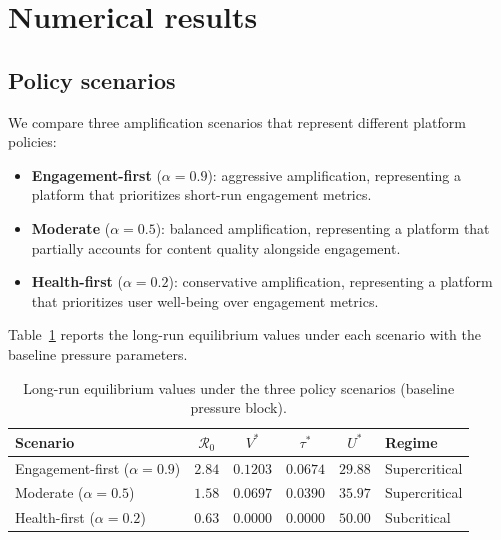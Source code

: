\documentclass[11pt]{article}
\begin{document}
\section{Numerical results}
\label{sec:results}

\subsection{Policy scenarios}

We compare three amplification scenarios that represent different platform policies:
\begin{itemize}[leftmargin=1.5em]
    \item \textbf{Engagement-first} ($\alpha = 0.9$): aggressive amplification, representing a platform that prioritizes short-run engagement metrics.
    \item \textbf{Moderate} ($\alpha = 0.5$): balanced amplification, representing a platform that partially accounts for content quality alongside engagement.
    \item \textbf{Health-first} ($\alpha = 0.2$): conservative amplification, representing a platform that prioritizes user well-being over engagement metrics.
\end{itemize}

Table~\ref{tab:scenarios} reports the long-run equilibrium values under each scenario with the baseline pressure parameters.

\begin{table}[H]
\centering
\caption{Long-run equilibrium values under the three policy scenarios (baseline pressure block).}
\label{tab:scenarios}
\begin{tabular}{lccccl}
\toprule
Scenario & $\mathcal{R}_0$ & $V^*$ & $\tau^*$ & $U^*$ & Regime \\
\midrule
Engagement-first ($\alpha = 0.9$) & $2.84$ & $0.1203$ & $0.0674$ & $29.88$ & Supercritical \\
Moderate ($\alpha = 0.5$) & $1.58$ & $0.0697$ & $0.0390$ & $35.97$ & Supercritical \\
Health-first ($\alpha = 0.2$) & $0.63$ & $0.0000$ & $0.0000$ & $50.00$ & Subcritical \\
\bottomrule
\end{tabular}
\end{table}
\end{document}
